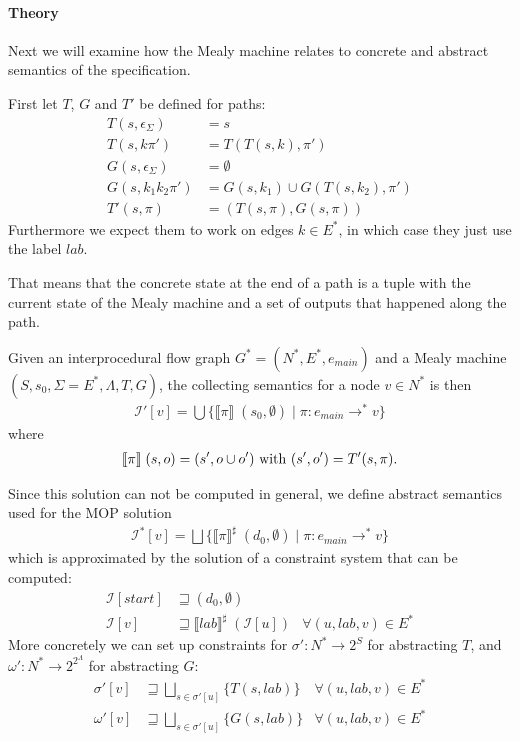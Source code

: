 \paragraph*{Theory}
Next we will examine how the Mealy machine relates to concrete and abstract semantics of the specification.

First let $T$, $G$ and $T'$ be defined for paths:
\begin{align}
T(s, \epsilon_\Sigma) &= s\\
T(s, k\pi') &= T(T(s, k), \pi')\\
G(s, \epsilon_\Sigma) &= \emptyset\\
G(s, k_1k_2\pi') &=  G(s, k_1) \cup G(T(s, k_2), \pi')\\
T'(s, \pi) &=  (T(s, \pi), G(s, \pi))
\end{align}
Furthermore we expect them to work on edges $k \in E^*$, in which case they just use the label $lab$.

That means that the concrete state at the end of a path is a tuple with the current state of the Mealy machine and a set of outputs that happened along the path.

Given an interprocedural flow graph $G^* = (N^*,E^*,e_{main})$ and a Mealy machine $(S, s_0, \Sigma=E^*, \Lambda, T, G)$, the collecting semantics for a node $v \in N^*$ is then
\begin{align}
\mathcal{I}'[v] = \bigcup \{\llbracket \pi \rrbracket \; (s_0, \emptyset) \; | \; \pi : e_{main} \to^* v\}
\end{align}
where
\begin{align}
\llbracket \pi \rrbracket \; (s,o) = (s', o \cup o') \text{ with } (s', o') = T'(s, \pi).
\end{align}

Since this solution can not be computed in general, we define abstract semantics used for the MOP solution
\begin{align}
\mathcal{I}^*[v] = \bigsqcup \{\llbracket \pi \rrbracket^\sharp \; (d_0, \emptyset) \; | \; \pi : e_{main} \to^* v\}
\end{align}
which is approximated by the solution of a constraint system that can be computed:
\begin{align}
\mathcal{I}[start] &\sqsupseteq (d_0, \emptyset)\\
\mathcal{I}[v]	   &\sqsupseteq \llbracket lab \rrbracket^\sharp \; (\mathcal{I}[u])	&\forall (u, lab, v) \in E^*
\end{align}
More concretely we can set up constraints for $\sigma' : N^* \to 2^S$ for abstracting $T$, and $\omega' : N^* \to 2^{2^\Lambda}$ for abstracting $G$:
\begin{align}
\sigma'[v] &\sqsupseteq \bigsqcup_{s\in\sigma'[u]} \{T(s,lab)\}	&\forall (u,lab,v)\in E^*\\
\omega'[v] &\sqsupseteq \bigsqcup_{s\in\sigma'[u]} \{G(s,lab)\}	&\forall (u,lab,v)\in E^*
\end{align}

